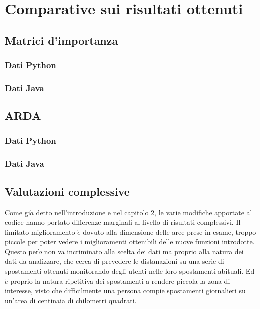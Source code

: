 \chapter{Comparative sui risultati ottenuti}

\section{Matrici d'importanza}
\subsection{Dati Python}
\subsection{Dati Java}

\section{ARDA}
\subsection{Dati Python}
\subsection{Dati Java}

\section{Valutazioni complessive}
Come gi$\grave{a}$ detto nell'introduzione e nel capitolo 2, le varie modifiche apportate
al codice hanno portato differenze marginali al livello di risultati complessivi.
Il limitato miglioramento $\grave{e}$ dovuto alla dimensione delle aree prese in esame, troppo
piccole per poter vedere i miglioramenti ottenibili delle nuove funzioni introdotte.\\
Questo per$\grave{o}$ non va incriminato alla scelta dei dati ma proprio alla natura dei
dati da analizzare, che cerca di prevedere le distanazioni su una serie di spostamenti
ottenuti monitorando degli utenti nelle loro spostamenti abituali. Ed $\grave{e}$ proprio la
natura ripetitiva dei spostamenti a rendere piccola la zona di interesse, visto che
difficilmente una persona compie spostamenti giornalieri su un'area di centinaia di
chilometri quadrati.
